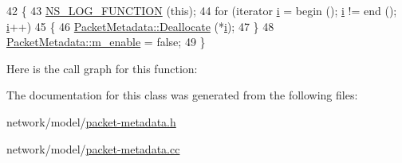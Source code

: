\begin{DoxyCode}
42 \{
43   \hyperlink{log-macros-disabled_8h_a90b90d5bad1f39cb1b64923ea94c0761}{NS\_LOG\_FUNCTION} (\textcolor{keyword}{this});
44   \textcolor{keywordflow}{for} (iterator \hyperlink{bernuolliDistribution_8m_a6f6ccfcf58b31cb6412107d9d5281426}{i} = begin (); \hyperlink{bernuolliDistribution_8m_a6f6ccfcf58b31cb6412107d9d5281426}{i} != end (); \hyperlink{bernuolliDistribution_8m_a6f6ccfcf58b31cb6412107d9d5281426}{i}++)
45     \{
46       \hyperlink{classns3_1_1PacketMetadata_a5284ea0e3b7e0e272ca521cb976431b7}{PacketMetadata::Deallocate} (*\hyperlink{bernuolliDistribution_8m_a6f6ccfcf58b31cb6412107d9d5281426}{i});
47     \}
48   \hyperlink{classns3_1_1PacketMetadata_a666ea556ffbd8f2226195cde1abe7ae7}{PacketMetadata::m\_enable} = \textcolor{keyword}{false};
49 \}
\end{DoxyCode}


Here is the call graph for this function\+:




The documentation for this class was generated from the following files\+:\begin{DoxyCompactItemize}
\item 
network/model/\hyperlink{packet-metadata_8h}{packet-\/metadata.\+h}\item 
network/model/\hyperlink{packet-metadata_8cc}{packet-\/metadata.\+cc}\end{DoxyCompactItemize}
